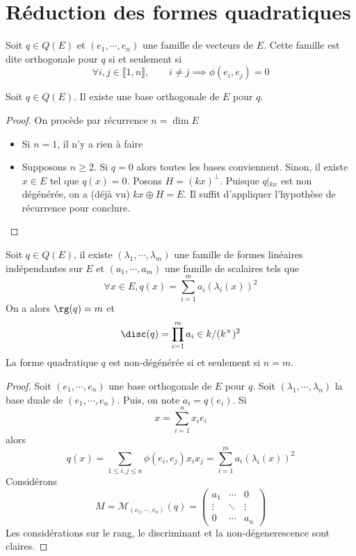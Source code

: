\section{Réduction des formes quadratiques}

\begin{dfn}
    Soit $q \in  Q(E)$ et $(e_1, \cdots , e_n)$ une famille de vecteurs de $E$. Cette famille est dite orthogonale pour  $q$  si et seulement si \[
        \forall  i,j \in  \llbracket 1, n \rrbracket , \qquad  i\neq j \implies \phi(e_i, e_j)=0
    \] 
\end{dfn}

\begin{thm}
    Soit $q \in  Q(E)$. Il existe une base orthogonale de $E$ pour  $q$.
\end{thm}

\begin{proof}
On procède par récurrence $n=\dim E$
\begin{itemize}
    \item Si $n=1$, il n'y a rien à faire
\item Supposons $n\geq 2$. Si $q=0$ alors toutes les bases conviennent. Sinon, il existe  $x \in  E$ tel que $q(x)=0$. Posons $H=(kx)^\bot$. Puisque  $q\left|_{kx}\right.$ est non dégénérée, on a (déjà vu) $kx\oplus H=E$. Il suffit d'appliquer l'hypothèse de récurrence pour conclure. 
\end{itemize}
\end{proof}

\begin{thm}
    Soit $q \in  Q(E)$, il existe $(\lambda_1, \cdots , \lambda_m)$ une famille de formes linéaires indépendantes sur $E$ et  $(a_1, \cdots , a_m)$ une famille de scalaires tels que \[
        \forall  x \in  E, q(x)=\sum_{i=1}^m a_i (\lambda_i(x))^2 
    \] 
    On a alors $\rg(q)=m$ et  \[
        \disc(q)=\prod_{i=1}^m a_i \in  k / (k^\times )^2 
    \]
    La forme quadratique $q$ est non-dégénérée  si et seulement si $n=m$.
\end{thm}

\begin{proof}
    Soit $(e_1, \cdots , e_n)$ une base orthogonale de $E$ pour  $q$. Soit  $(\lambda_1, \cdots , \lambda_n)$ la base duale de $(e_1, \cdots , e_n)$. Puis, on note $a_i=q(e_i)$. Si  \[
    x= \sum_{i=1}^n x_ie_i
    \] 
    alors \[
        q(x)= \sum_{1\leq i,j\leq n} \phi(e_i, e_j)x_ix_j=\sum_{i=1}^m a_i (\lambda_i(x))^2 
    \] 
    Considérons \[
        M=\mathcal  M_{(e_1, \cdots , e_n)}(q)=
        \begin{pmatrix}
            a_1 & \cdots  & 0 \\
            \vdots & \ddots & \vdots \\
            0 & \cdots  & a_n
        \end{pmatrix}
    \] 
    Les considérations sur le rang, le discriminant et la non-dégenerescence sont claires.
\end{proof}

